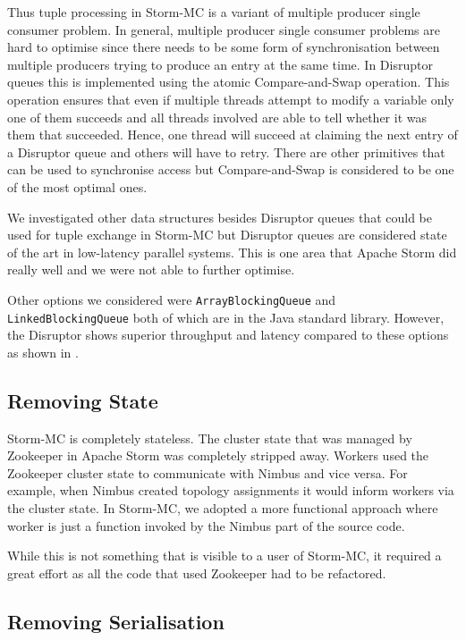 Thus tuple processing in Storm-MC is a variant of multiple producer single consumer problem. In general, multiple producer single consumer problems are hard to optimise since there needs to be some form of synchronisation between multiple producers trying to produce an entry at the same time. In Disruptor queues this is implemented using the atomic Compare-and-Swap operation. This operation ensures that even if multiple threads attempt to modify a variable only one of them succeeds and all threads involved are able to tell whether it was them that succeeded. Hence, one thread will succeed at claiming the next entry of a Disruptor queue and others will have to retry. There are other primitives that can be used to synchronise access but Compare-and-Swap is considered to be one of the most optimal ones.


We investigated other data structures besides Disruptor queues that could be used for tuple exchange in Storm-MC but Disruptor queues are considered state of the art in low-latency parallel systems. This is one area that Apache Storm did really well and we were not able to further optimise.

Other options we considered were \texttt{ArrayBlockingQueue} and \texttt{LinkedBlockingQueue} both of which are in the Java standard library. However, the Disruptor shows superior throughput and latency compared to these options as shown in \citep{DisruptorWiki}.

\subsection{Removing State}

Storm-MC is completely stateless. The cluster state that was managed by Zookeeper in Apache Storm was completely stripped away. Workers used the Zookeeper cluster state to communicate with Nimbus and vice versa. For example, when Nimbus created topology assignments it would inform workers via the cluster state. In Storm-MC, we adopted a more functional approach where worker is just a function invoked by the Nimbus part of the source code.

While this is not something that is visible to a user of Storm-MC, it required a great effort as all the code that used Zookeeper had to be refactored.

\subsection{Removing Serialisation}

